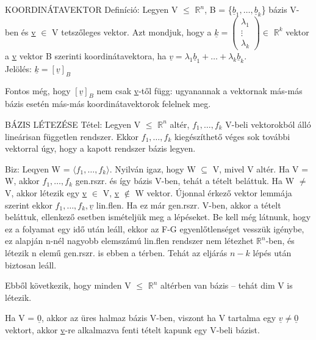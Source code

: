\documentclass[]{article}
\newcommand{\Rn}[1]{$\mathbb{R}^{#1}$}
\newcommand{\Und}[1]{\underline{#1}}
\begin{document}
\begin{shaded}
KOORDINÁTAVEKTOR Definíció: Legyen V $\leq$ \Rn{n}, B = \{$\Und{b}_1,\ldots,\Und{b}_k$\} bázis V-ben és \Und{v} $\in$ V tetszőleges vektor. Azt mondjuk, hogy a $\Und{k} = \begin{pmatrix}
\lambda_1\\
\vdots\\
\lambda_k
\end{pmatrix}\in$ \Rn{k} vektor a \Und{v} vektor B szerinti koordinátavektora, ha $\Und{v} = \lambda_1\Und{b}_1 + \ldots + \lambda_k\Und{b}_k$.\\
Jelölés: $\Und{k} = [\Und{v}]_B$
\end{shaded}
Fontos még, hogy $[\Und{v}]_B$ nem csak \Und{v}-től függ: ugyanannak a vektornak más-más bázis esetén más-más koordinátavektorok felelnek meg. 
\begin{framed}
BÁZIS LÉTEZÉSE Tétel: Legyen V $\leq$ \Rn{n} altér, $f_1, \ldots, f_k$ V-beli vektorokból álló lineárisan független rendszer. Ekkor $f_1, \ldots, f_k$ kiegészíthető véges sok további vektorral úgy, hogy a kapott rendszer bázis legyen.
\end{framed}
\begin{leftbar}
Biz: Leqyen W = $\langle f_1, \ldots, f_k \rangle$. Nyilván igaz, hogy W $\subseteq$ V, mivel V altér. Ha V = W, akkor $f_1, \ldots, f_k$ gen.rszr. és így bázis V-ben, tehát a tételt beláttuk. Ha W $\neq$ V, akkor létezik egy \Und{v} $\in$ V, \Und{v} $\notin$ W vektor. Újonnal érkező vektor lemmája szerint ekkor $f_1, \ldots, f_k, \Und{v}$ lin.flen. Ha ez már gen.rszr. V-ben, akkor a tételt beláttuk, ellenkező esetben ismételjük meg a lépéseket. Be kell még látnunk, hogy ez a folyamat egy idő után leáll, ekkor az F-G egyenlőtlenséget vesszük igénybe, ez alapján n-nél nagyobb elemszámú lin.flen rendszer nem létezhet \Rn{n}-ben, és létezik n elemű gen.rszr. is ebben a térben. Tehát az eljárás $n-k$ lépés után biztosan leáll.
\end{leftbar}
Ebből következik, hogy minden V $\leq$ \Rn{n} altérben van bázis -- tehát dim V is létezik.
\begin{leftbar}
Ha V = ${\Und{0}}$, akkor az üres halmaz bázis V-ben, viszont ha V tartalma egy $\Und{v} \neq \Und{0}$ vektort, akkor \Und{v}-re alkalmazva fenti tételt kapunk egy V-beli bázist.
\end{leftbar} 
\end{document}
